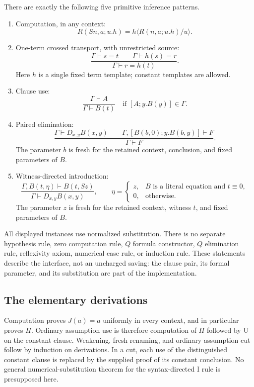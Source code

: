 \documentclass[11pt,letterpaper]{article}
\theoremstyle{definition}\newtheorem{definition}[theorem]{Definition}
\begin{document}
There are exactly the following five primitive inference patterns.
\begin{enumerate}
\item Computation, in any context:
\[
 R(Sn,a;u.h)=h\langle R(n,a;u.h)/u\rangle.
 \tag{R}
\]
\item One-term crossed transport, with unrestricted source:
\[
 \frac{\Gamma\vdash s=t\qquad\Gamma\vdash h(s)=r}
      {\Gamma\vdash r=h(t)}.
 \tag{T}
\]
Here $h$ is a single fixed term template; constant templates are allowed.
\item Clause use:
\[
 \frac{\Gamma\vdash A}{\Gamma\vdash B(t)}
 \quad\text{if }[A;y.B(y)]\in\Gamma.
 \tag{U}
\]
\item Paired elimination:
\[
 \frac{\Gamma\vdash D_{x,y}B(x,y)\qquad
       \Gamma,[B(b,0);y.B(b,y)]\vdash F}
      {\Gamma\vdash F}.
 \tag{E}
\]
The parameter $b$ is fresh for the retained context, conclusion, and
fixed parameters of $B$.
\item Witness-directed introduction:
\[
 \frac{\Gamma,B(t,\eta)\vdash B(t,Sz)}
      {\Gamma\vdash D_{x,y}B(x,y)},\qquad
 \eta=\begin{cases}
 z,&B\text{ is a literal equation and }t\equiv0,\\
 0,&\text{otherwise}.
 \end{cases}
 \tag{I}
\]
The parameter $z$ is fresh for the retained context, witness $t$, and
fixed parameters of $B$.
\end{enumerate}
All displayed instances use normalized substitution. There is no separate
hypothesis rule, zero computation rule, $Q$ formula constructor, $Q$
elimination rule, reflexivity axiom, numerical case rule, or induction
rule. These statements describe the interface, not an uncharged saving:
the clause pair, its formal parameter, and its substitution are part of
the implementation.

\subsection{The elementary derivations}

Computation proves $J(a)=a$ uniformly in every context, and in particular
proves $H$. Ordinary assumption use is therefore computation of $H$
followed by U on the constant clause. Weakening, fresh renaming, and
ordinary-assumption cut follow by induction on derivations. In a cut,
each use of the distinguished constant clause is replaced by the supplied
proof of its constant conclusion. No general numerical-substitution
theorem for the syntax-directed I rule is presupposed here.
\end{document}
